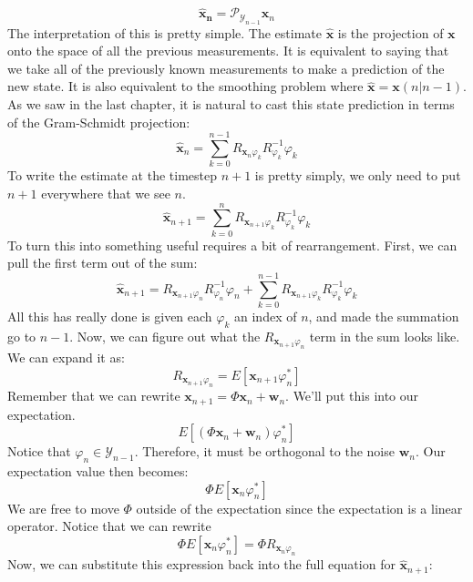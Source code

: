 $$\bm{\hat{x}_n}=\mathcal{P}_{\mathcal{Y}_{n-1}}\bm{x}_n$$
The interpretation of this is pretty simple. The estimate $\bm{\hat{x}}$ is the projection of $\bm{x}$ onto the space of all the previous measurements. It is equivalent to saying that we take all of the previously known measurements to make a prediction of the new state. It is also equivalent to the smoothing problem where $\bm{\hat{x}}=\bm{x}(n|n-1)$. As we saw in the last chapter, it is natural to cast this state prediction in terms of the Gram-Schmidt projection:
$$\bm{\hat{x}}_n=\sum_{k=0}^{n-1}R_{\bm{x}_n \varphi_k} R_{\varphi_{k}}^{-1}\varphi_k$$
To write the estimate at the timestep $n+1$ is pretty simply, we only need to put $n+1$ everywhere that we see $n$.
$$\bm{\hat{x}}_{n+1}=\sum_{k=0}^{n}R_{\bm{x}_{n+1} \varphi_k} R_{\varphi_{k}}^{-1}\varphi_k$$
To turn this into something useful requires a bit of rearrangement. First, we can pull the first term out of the sum:
$$\bm{\hat{x}}_{n+1}=R_{\bm{x}_{n+1} \varphi_n} R_{\varphi_{n}}^{-1}\varphi_n+\sum_{k=0}^{n-1}R_{\bm{x}_{n+1} \varphi_k} R_{\varphi_{k}}^{-1}\varphi_k$$
All this has really done is given each $\varphi_k$ an index of $n$, and made the summation go to $n-1$. Now, we can figure out what the $R_{\bm{x}_{n+1} \varphi_n}$ term in the sum looks like. We can expand it as:
$$R_{\bm{x}_{n+1} \varphi_n}=E[\bm{x}_{n+1} \varphi_n^*]$$
Remember that we can rewrite $\bm{{x}}_{n+1}=\Phi\bm{x}_n+\bm{w}_n$. We'll put this into our expectation.
$$E[(\Phi\bm{x}_n+\bm{w}_n) \varphi_n^*]$$
Notice that $\varphi_n\in\mathcal{Y}_{n-1}$. Therefore, it must be orthogonal to the noise $\bm{w}_n$. Our expectation value then becomes:
$$\Phi E[\bm{x}_n \varphi_n^*]$$
We are free to move $\Phi$ outside of the expectation since the expectation is a linear operator. Notice that we can rewrite $$\Phi E[\bm{x}_n \varphi_n^*]=\Phi R_{\bm{x}_{n} \varphi_n}$$
Now, we can substitute this expression back into the full equation for $\bm{\hat{x}}_{n+1}$:

